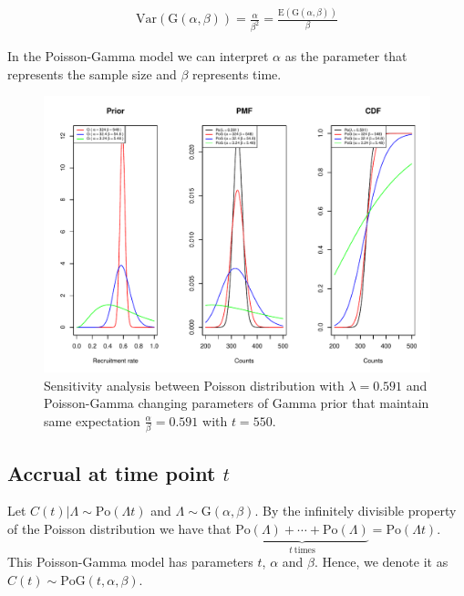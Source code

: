 \begin{align*}
\textrm{Var}(\textrm{G}(\alpha, \beta)) = \frac{\alpha}{\beta^2} =\frac{\textrm{E}(\textrm{G}(\alpha, \beta))}{\beta}
\end{align*}

In the Poisson-Gamma model we can interpret $\alpha$ as the parameter that represents the sample size and $\beta$ represents time.

\begin{figure}
\begin{knitrout}
\color{fgcolor}

{\centering \includegraphics[width=\textwidth-3cm]{figure/ch02_figunnamed-chunk-10-1} 

}


\end{knitrout}
	\caption{Sensitivity analysis between Poisson distribution with $\lambda = 0.591$ and Poisson-Gamma changing parameters of Gamma prior that maintain same expectation $\frac{\alpha}{\beta} = 0.591$ with $t=550$.}
  \label{fig:2_6b}
\end{figure}

\subsection{Accrual at time point $t$}

Let $C(t)|\Lambda \sim \textrm{Po}(\Lambda t)$ and $\Lambda \sim \textrm{G}(\alpha,\beta)$. By the infinitely divisible property of the Poisson distribution we have that $\underbrace{\textrm{Po} (\Lambda) +\cdots +\textrm{Po} (\Lambda)}_{t \ \text{times}} = \textrm{Po} (\Lambda t)$. This Poisson-Gamma model has parameters $t$, $\alpha$ and $\beta$. Hence, we denote it as $C(t)\sim \textrm{PoG}(t, \alpha, \beta)$.

